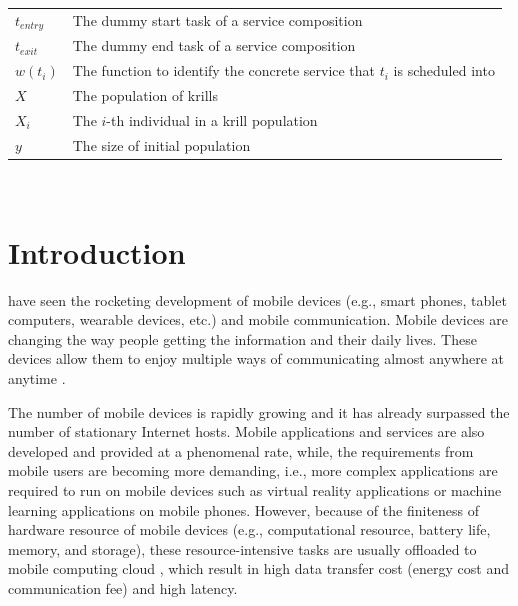 \documentclass[journal]{IEEEtran}
\begin{document}
\noindent
\begin{tabular}{@{} l p{7.36cm} }
$t_{entry}$   &   The dummy start task of a service composition \\
$t_{exit}$    &   The dummy end task of a service composition \\
$w(t_i)$      &   The function to identify the concrete service that $t_i$ is scheduled into \\
$X$           &   The population of krills \\
$X_i$         &   The $i$-th individual in a krill population \\
$y$           &   The size of initial population
\end{tabular}
~\\

\IEEEpeerreviewmaketitle

\section{Introduction}

 have seen the rocketing development of mobile devices (e.g., smart phones, tablet computers, wearable devices, etc.) and mobile communication.
Mobile devices are changing the way people getting the information and their daily lives.
These devices allow them to enjoy multiple ways of communicating almost anywhere at anytime \cite{satyanarayanan2010mobile}.

The number of mobile devices is rapidly growing and it has already surpassed the number of stationary Internet hosts.
Mobile applications and services are also developed and provided at a phenomenal rate, while, the requirements from mobile users are becoming more demanding, i.e., more complex applications are required to run on mobile devices such as virtual reality applications \cite{bastug2017toward} or machine learning applications \cite{abadi2016TensorFlow} on mobile phones. However, because of the finiteness of hardware resource of mobile devices (e.g., computational resource, battery life, memory, and storage), these resource-intensive tasks are usually offloaded to mobile computing cloud \cite{dinh2013survey}, which result in high data transfer cost (energy cost and communication fee) and high latency.
\end{document}
